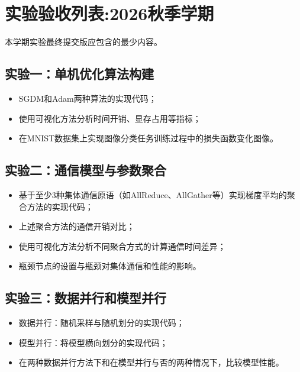 \chapter{实验验收列表:2026秋季学期}

本学期实验最终提交版应包含的最少内容。

\section{实验一：单机优化算法构建}
\begin{itemize}
    \item SGDM和Adam两种算法的实现代码；
    \item 使用可视化方法分析时间开销、显存占用等指标；
    \item 在MNIST数据集上实现图像分类任务训练过程中的损失函数变化图像。
\end{itemize}

\section{实验二：通信模型与参数聚合}
\begin{itemize}
    \item 基于至少3种集体通信原语（如AllReduce、AllGather等）实现梯度平均的聚合方法的实现代码；
    \item 上述聚合方法的通信开销对比；
    \item 使用可视化方法分析不同聚合方式的计算通信时间差异；
    \item 瓶颈节点的设置与瓶颈对集体通信和性能的影响。
\end{itemize}

\section{实验三：数据并行和模型并行}
\begin{itemize}
    \item 数据并行：随机采样与随机划分的实现代码；
    \item 模型并行：将模型横向划分的实现代码；
    \item 在两种数据并行方法下和在模型并行与否的两种情况下，比较模型性能。
\end{itemize}

